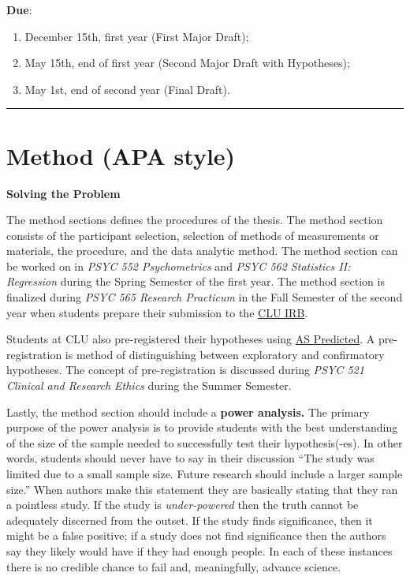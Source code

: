 \documentclass[
  openany]{book}
\providecommand{\tightlist}{%
  \setlength{\itemsep}{0pt}\setlength{\parskip}{0pt}}
\begin{document}
\textbf{Due}:

\begin{enumerate}
\def\labelenumi{\arabic{enumi}.}
\tightlist
\item
  December 15th, first year (First Major Draft);
\item
  May 15th, end of first year (Second Major Draft with Hypotheses);
\item
  May 1st, end of second year (Final Draft).
\end{enumerate}

\begin{center}\rule{0.5\linewidth}{0.5pt}\end{center}

\hypertarget{method-apa-style}{%
\section{Method (APA style)}\label{method-apa-style}}

\textbf{Solving the Problem}

The method sections defines the procedures of the thesis. The method section consists of the participant selection, selection of methods of measurements or materials, the procedure, and the data analytic method. The method section can be worked on in \emph{PSYC 552 Psychometrics} and \emph{PSYC 562 Statistics II: Regression} during the Spring Semester of the first year. The method section is finalized during \emph{PSYC 565 Research Practicum} in the Fall Semester of the second year when students prepare their submission to the \href{https://www.callutheran.edu/research/irb/}{CLU IRB}.

Students at CLU also pre-registered their hypotheses using \href{https://aspredicted.org/}{AS Predicted}. A pre-registration is method of distinguishing between exploratory and confirmatory hypotheses. The concept of pre-registration is discussed during \emph{PSYC 521 Clinical and Research Ethics} during the Summer Semester.

Lastly, the method section should include a \textbf{power analysis.} The primary purpose of the power analysis is to provide students with the best understanding of the size of the sample needed to successfully test their hypothesis(-es). In other words, students should never have to say in their discussion ``The study was limited due to a small sample size. Future research should include a larger sample size.'' When authors make this statement they are basically stating that they ran a pointless study. If the study is \emph{under-powered} then the truth cannot be adequately discerned from the outset. If the study finds significance, then it might be a false positive; if a study does not find significance then the authors say they likely would have if they had enough people. In each of these instances there is no credible chance to fail and, meaningfully, advance science.
\end{document}
